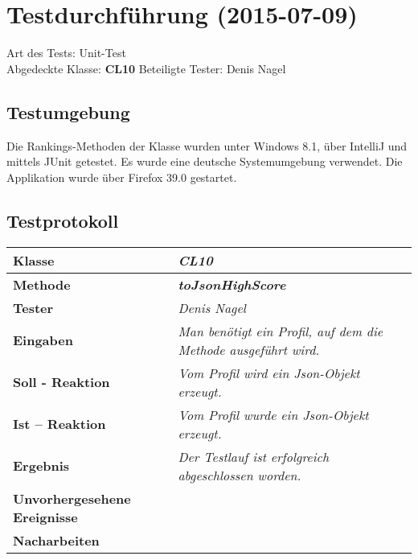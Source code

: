 
\chapter{Testdurchführung (2015-07-09)}

Art des Tests: Unit-Test\\
Abgedeckte Klasse: \textbf{CL10}
Beteiligte Tester: Denis Nagel\\

\section{Testumgebung}

Die Rankings-Methoden der Klasse wurden unter Windows 8.1, über IntelliJ und mittels JUnit getestet. Es wurde eine deutsche Systemumgebung verwendet. Die Applikation wurde über Firefox 39.0 gestartet.

\section{Testprotokoll}

\begin{longtable}{|p{4cm}|p{11cm}|}
\hline
\textbf{Klasse} & \textit{\textbf{CL10}} \\
\hline
\textbf{Methode} & \textit{\textbf{toJsonHighScore}} \\
\hline
\textbf{Tester} & \textit{Denis Nagel} \\
\hline
\textbf{Eingaben} & \textit{Man benötigt ein Profil, auf dem die Methode ausgeführt wird.} \\
\hline
\textbf{Soll - Reaktion} & \textit{Vom Profil wird ein Json-Objekt erzeugt.} \\
\hline
\textbf{Ist -- Reaktion} & \textit{Vom Profil wurde ein Json-Objekt erzeugt.} \\
\hline
\textbf{Ergebnis} & \textit{Der Testlauf ist erfolgreich abgeschlossen worden.} \\
\hline
\textbf{Unvorhergesehene Ereignisse} &
\textit{} \\
\hline
\textbf{Nacharbeiten } & \textit{} \\
\hline
\end{longtable}

